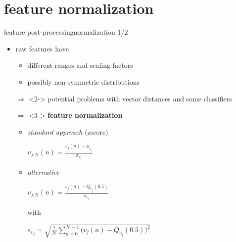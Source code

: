     \section[normalization]{feature normalization}
		\begin{frame}{feature post-processing}{normalization 1/2}
            \begin{itemize}
                \item   raw features have
                    \begin{itemize}
                        \item	different ranges and scaling factors
                        \item	possibly non-symmetric distributions
                    \end{itemize}
                \smallskip
                \item[$\Rightarrow$]<2->    potential problems with vector distances and some classifiers
                \bigskip
                \item[$\Rightarrow$]<3->    \textbf{feature normalization}
                    \begin{itemize}
                        \item \textit{standard approach} (zscore) \begin{flushright}$v_{j,\mathrm{N}}(n) = \frac{v_j(n) - \mu_{v_j}}{\sigma_{v_j}}$\end{flushright}
                        \item \textit{alternative} \begin{flushright}$  v_{j,\mathrm{N}}(n) = \frac{v_j(n) - Q_{v_j}(0.5)}{s_{v_j}}$\end{flushright}
                        with \begin{flushright}$ s_{v_j} = \sqrt{\frac{1}{\mathcal{N}}\sum\limits_{n=0}^{\mathcal{N}-1}{\big(v_j(n)-Q_{v_j}(0.5)\big)^2}}$\end{flushright}
                     \end{itemize}
            \end{itemize}
			
		\end{frame}
